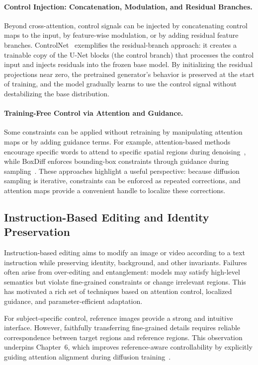 \paragraph{Control Injection: Concatenation, Modulation, and Residual Branches.}
Beyond cross-attention, control signals can be injected by concatenating control maps to the input, by feature-wise modulation, or by adding residual feature branches. ControlNet~\citep{zhang2023adding} exemplifies the residual-branch approach: it creates a trainable copy of the U-Net blocks (the control branch) that processes the control input and injects residuals into the frozen base model. By initializing the residual projections near zero, the pretrained generator's behavior is preserved at the start of training, and the model gradually learns to use the control signal without destabilizing the base distribution.

\paragraph{Training-Free Control via Attention and Guidance.}
Some constraints can be applied without retraining by manipulating attention maps or by adding guidance terms. For example, attention-based methods encourage specific words to attend to specific spatial regions during denoising~\citep{chefer2023attend, cao2023masactrl}, while BoxDiff enforces bounding-box constraints through guidance during sampling~\citep{xie2023boxdiff}. These approaches highlight a useful perspective: because diffusion sampling is iterative, constraints can be enforced as repeated corrections, and attention maps provide a convenient handle to localize these corrections.

\subsection{Instruction-Based Editing and Identity Preservation}
Instruction-based editing aims to modify an image or video according to a text instruction while preserving identity, background, and other invariants. Failures often arise from over-editing and entanglement: models may satisfy high-level semantics but violate fine-grained constraints or change irrelevant regions. This has motivated a rich set of techniques based on attention control, localized guidance, and parameter-efficient adaptation.

For subject-specific control, reference images provide a strong and intuitive interface. However, faithfully transferring fine-grained details requires reliable correspondence between target regions and reference regions. This observation underpins Chapter~6, which improves reference-aware controllability by explicitly guiding attention alignment during diffusion training~\citep{zhou2025learning}.

